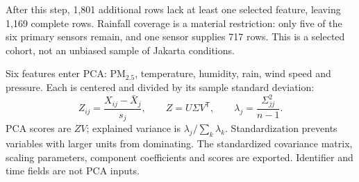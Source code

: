 \documentclass[11pt,a4paper]{article}
\begin{document}
After this step, 1,801 additional rows lack at least one selected feature, leaving 1,169 complete rows. Rainfall coverage is a material restriction: only five of the six primary sensors remain, and one sensor supplies 717 rows. This is a selected cohort, not an unbiased sample of Jakarta conditions.

Six features enter PCA: PM$_{2.5}$, temperature, humidity, rain, wind speed and pressure. Each is centered and divided by its sample standard deviation:
\[
 Z_{ij}=\frac{X_{ij}-\bar X_j}{s_j},\qquad
 Z=U\Sigma V^\mathsf{T},\qquad
 \lambda_j=\frac{\Sigma_{jj}^2}{n-1}.
\]
PCA scores are $ZV$; explained variance is $\lambda_j/\sum_k\lambda_k$. Standardization prevents variables with larger units from dominating. The standardized covariance matrix, scaling parameters, component coefficients and scores are exported. Identifier and time fields are not PCA inputs.
\end{document}

